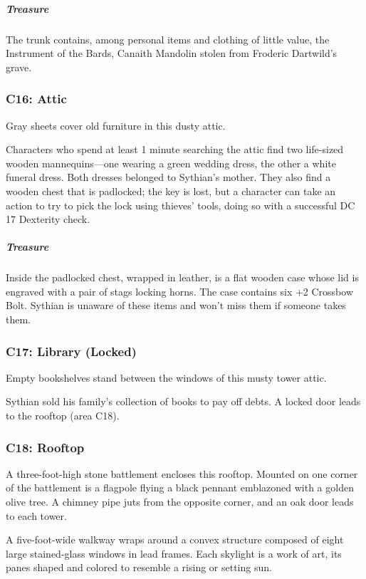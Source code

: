 \documentclass[10pt,a4paper,twoside,bg=print,twocolumn,openany,nodeprecatedcode]{dndbook}
\begin{document}
\subparagraph{Treasure}
The trunk contains, among personal items and clothing of little value, the Instrument of the Bards, Canaith Mandolin stolen from Froderic Dartwild's grave.

\subsubsection{C16: Attic}
\begin{DndReadAloud}{}
Gray sheets cover old furniture in this dusty attic.

\end{DndReadAloud}

Characters who spend at least 1 minute searching the attic find two life-sized wooden mannequins—one wearing a green wedding dress, the other a white funeral dress. Both dresses belonged to Sythian's mother. They also find a wooden chest that is padlocked; the key is lost, but a character can take an action to try to pick the lock using thieves' tools, doing so with a successful DC 17 Dexterity check.

\subparagraph{Treasure}
Inside the padlocked chest, wrapped in leather, is a flat wooden case whose lid is engraved with a pair of stags locking horns. The case contains six +2 Crossbow Bolt. Sythian is unaware of these items and won't miss them if someone takes them.

\subsubsection{C17: Library (Locked)}
\begin{DndReadAloud}{}
Empty bookshelves stand between the windows of this musty tower attic.

\end{DndReadAloud}

Sythian sold his family's collection of books to pay off debts. A locked door leads to the rooftop (area C18).

\subsubsection{C18: Rooftop}
\begin{DndReadAloud}{}
A three-foot-high stone battlement encloses this rooftop. Mounted on one corner of the battlement is a flagpole flying a black pennant emblazoned with a golden olive tree. A chimney pipe juts from the opposite corner, and an oak door leads to each tower.

A five-foot-wide walkway wraps around a convex structure composed of eight large stained-glass windows in lead frames. Each skylight is a work of art, its panes shaped and colored to resemble a rising or setting sun.

\end{DndReadAloud}
\end{document}
